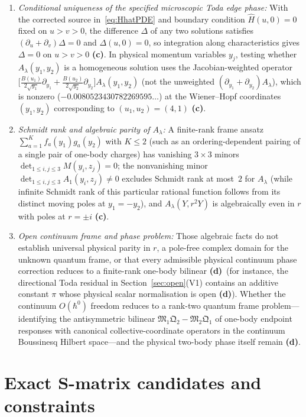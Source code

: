 \documentclass[11pt,a4paper]{article}
\newcommand{\lab}[1]{{\normalfont\sffamily\footnotesize\bfseries(#1)}}
\newcommand{\Lc}{\lab{c}}
\newcommand{\Ld}{\lab{d}}
\newcommand{\hb}{\hbar}
\theoremstyle{remark}
\begin{document}
\begin{enumerate}
\item \emph{Conditional uniqueness of the specified microscopic Toda edge phase:} With the corrected source in~\eqref{eq:HhatPDE} and boundary condition $\widehat H(u,0)=0$ fixed on $u>v>0$, the difference $\Delta$ of any two solutions satisfies $(\partial_u+\partial_v)\Delta=0$ and $\Delta(u,0)=0$, so integration along characteristics gives $\Delta=0$ on $u>v>0$ \Lc. In physical momentum variables $y_j$, testing whether $A_\lambda(y_1,y_2)$ is a homogeneous solution uses the Jacobian-weighted operator $\big[\frac{B(u_1)}{2\sqrt{y_1}}\partial_{y_1}+\frac{B(u_2)}{2\sqrt{y_2}}\partial_{y_2}\big]A_\lambda(y_1,y_2)$ (not the unweighted $(\partial_{y_1}+\partial_{y_2})A_\lambda$), which is nonzero ($-0.0080523430782269595\ldots$) at the Wiener--Hopf coordinates $(y_1,y_2)$ corresponding to $(u_1,u_2)=(4,1)$ \Lc.
\item \emph{Schmidt rank and algebraic parity of $A_\lambda$:} A finite-rank frame ansatz $\sum_{a=1}^Kf_a(y_1)g_a(y_2)$ with $K\le2$ (such as an ordering-dependent pairing of a single pair of one-body charges) has vanishing $3\times3$ minors $\det_{1\le i,j\le3}M(y_i,z_j)=0$; the nonvanishing minor $\det_{1\le i,j\le3}A_1(y_i,z_j)\neq0$ excludes Schmidt rank at most~$2$ for $A_\lambda$ (while infinite Schmidt rank of this particular rational function follows from its distinct moving poles at $y_1=-y_2$), and $A_\lambda(Y,r^2Y)$ is algebraically even in $r$ with poles at $r=\pm i$ \Lc.
\item \emph{Open continuum frame and phase problem:} Those algebraic facts do not establish universal physical parity in $r$, a pole-free complex domain for the unknown quantum frame, or that every admissible physical continuum phase correction reduces to a finite-rank one-body bilinear \Ld\ (for instance, the directional Toda residual in Section~\ref{sec:open}(V1) contains an additive constant $\pi$ whose physical scalar normalisation is open \Ld). Whether the continuum $O(\hb^0)$ freedom reduces to a rank-two quantum frame problem---identifying the antisymmetric bilinear $\mathfrak M_1\mathfrak Q_2-\mathfrak M_2\mathfrak Q_1$ of one-body endpoint responses with canonical collective-coordinate operators in the continuum Boussinesq Hilbert space---and the physical two-body phase itself remain \Ld.
\end{enumerate}

\section{Exact S-matrix candidates and constraints}\label{sec:exact}
\end{document}
